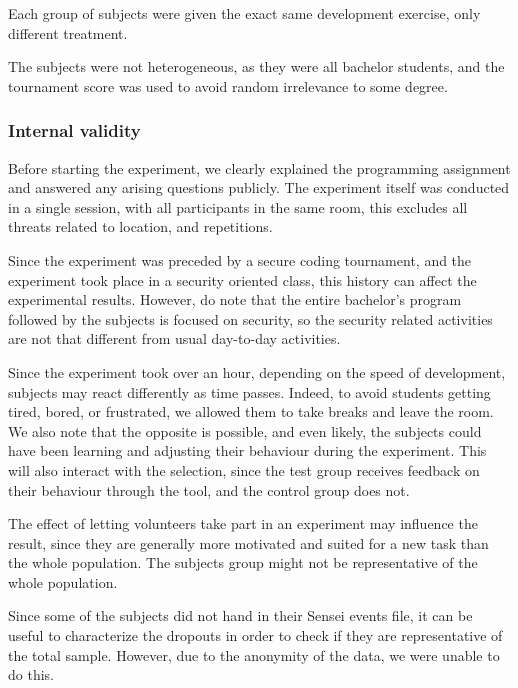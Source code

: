 Each group of subjects were given the exact same development exercise, only different treatment.
 
The subjects were not heterogeneous, as they were all bachelor students, and the tournament score was used to avoid random irrelevance to some degree.

\subsubsection{Internal validity}%
Before starting the experiment, we clearly explained the programming assignment and answered any arising questions publicly.
The experiment itself was conducted in a single session, with all participants in the same room, this excludes all threats related to location, and repetitions.

Since the experiment was preceded by a secure coding tournament, and the experiment took place in a security oriented class, this history can affect the experimental results.
However, do note that the entire bachelor's program followed by the subjects is focused on security, so the security related activities are not that different from usual day-to-day activities.

Since the experiment took over an hour, depending on the speed of development, subjects may react differently as time passes.
Indeed, to avoid students getting tired, bored, or frustrated, we allowed them to take breaks and leave the room.
We also note that the opposite is possible, and even likely, the subjects could have been learning and adjusting their behaviour during the experiment.
This will also interact with the selection, since the test group receives feedback on their behaviour through the tool, and the control group does not.

The effect of letting volunteers take part in an experiment may influence the result, since they are generally more motivated and suited for a new task than the whole population.
The subjects group might not be representative of the whole population.

Since some of the subjects did not hand in their Sensei events file, it can be useful to characterize the dropouts in order to check if they are representative of the total sample.
However, due to the anonymity of the data, we were unable to do this.

